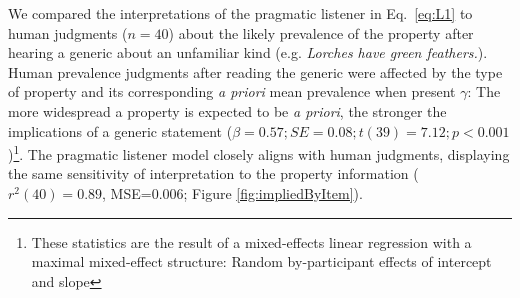 \documentclass{pnastwo}
\begin{document}
\begin{article}


We compared the interpretations of the pragmatic listener in Eq.~\ref{eq:L1} to human judgments ($n=40$) about the likely prevalence of the property after hearing a generic about an unfamiliar kind (e.g. \emph{Lorches have green feathers.}). %
Human prevalence judgments after reading the generic were affected by the type of property and its corresponding \emph{a priori} mean prevalence when present $\gamma$: The more widespread a property is expected to be \emph{a priori}, the stronger the implications of a generic statement ($\beta = 0.57; SE = 0.08; t(39) = 7.12; p < 0.001$)\footnote{These statistics are the result of a mixed-effects linear regression with a maximal mixed-effect structure: Random by-participant effects of intercept and slope}. 
The pragmatic listener model closely aligns with human judgments, displaying the same sensitivity of interpretation to the property information ($r^2(40)=0.89$, MSE=0.006; Figure \ref{fig:impliedByItem}). 











\end{article}
\end{document}
